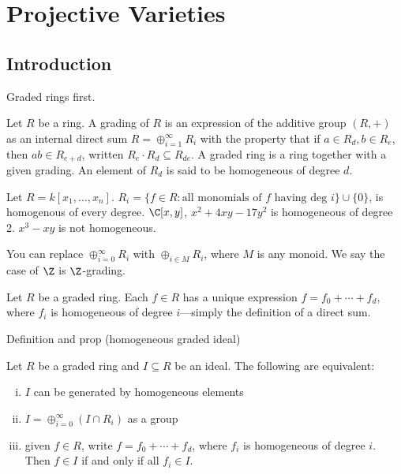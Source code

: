\newpage
\section{Projective Varieties}
\subsection{Introduction}

Graded rings first.

\begin{dfn}
Let $R$ be a ring. A grading of $R$ is an expression of the additive group $(R,+)$ as an internal direct sum $R= \oplus_{i=1}^\infty R_i$ with the property that if $a \in R_d, b \in R_e$, then $ab \in R_{e+d}$, written $R_e \cdot R_d \subseteq R_{de}$. A graded ring is a ring together with a given grading. An element of $R_d$ is said to be homogeneous of degree $d$. 
\end{dfn}


\begin{ex}
Let $R= k[x_1,\ldots,x_n]$. $R_i= \{ f \in R \colon \text{all monomials of } f  \text{ having deg }i\} \cup \{0\}$, is homogenous of every degree. $\C[x,y]$, $x^2+4xy-17y^2$ is homogeneous of degree 2. $x^3-xy$ is not homogeneous. \xqed
\end{ex}


\begin{rem}
You can replace $\oplus_{i=0}^\infty R_i$ with $\oplus_{i \in M} R_i$, where $M$ is any monoid. We say the case of $\Z$ is $\Z$-grading. 
\end{rem}


Let $R$ be a graded ring. Each $f \in R$ has a unique expression $f= f_0 + \cdots + f_d$, where $f_i$ is homogeneous of degree $i$---simply the definition of a direct sum. 


















Definition and prop (homogeneous graded ideal)


\begin{prop}
Let $R$ be a graded ring and $I \subseteq R$ be an ideal. The following are equivalent:
\begin{enumerate}[(i)]
\item $I$ can be generated by homogeneous elements
\item $I= \oplus_{i=0}^\infty (I \cap R_i)$ as a group
\item given $f \in R$, write $f= f_0 + \cdots + f_d$, where $f_i$ is homogeneous of degree $i$. Then $f \in I$ if and only if all $f_i \in I$. 
\end{enumerate}
\end{prop}

